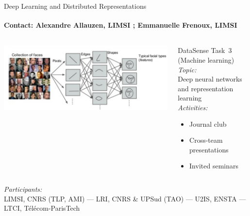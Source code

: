 \begin{frame}{Deep Learning and Distributed Representations}
\framesubtitle{Contact: Alexandre Allauzen, LIMSI ; Emmanuelle Frenoux, LIMSI }
\vspace{-1cm}
{\color{blue} }
\begin{columns}
  \begin{column}{8cm}
    \includegraphics[width=\linewidth]{Images/dl.png}
  \end{column}
  \begin{column}{5cm}
    DataSense Task~3 (Machine learning)\\[2ex]
    
    \emph{Topic:}\\
    Deep neural networks and representation learning\\[2ex]
    
    \emph{Activities:}
    \begin{itemize}
    \item Journal club
    \item Cross-team presentations
    \item Invited seminars
    \end{itemize}
  \end{column}
  
\end{columns}
\vfill

  \emph{Participants:}\\
    LIMSI, CNRS (TLP, AMI) ---
    LRI, CNRS \& UPSud (TAO) ---
    U2IS, ENSTA ---
    LTCI, Télécom-ParisTech



\end{frame}


